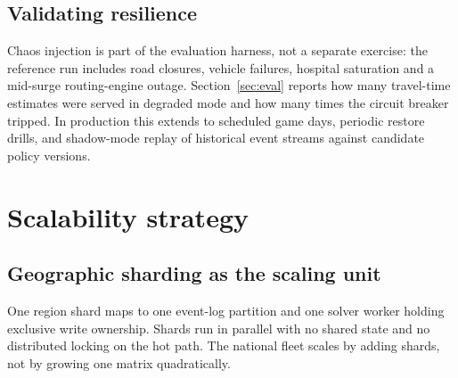 \subsection{Validating resilience}

Chaos injection is part of the evaluation harness, not a separate exercise: the
reference run includes road closures, vehicle failures, hospital saturation and
a mid-surge routing-engine outage. Section~\ref{sec:eval} reports how many
travel-time estimates were served in degraded mode and how many times the
circuit breaker tripped. In production this extends to scheduled game days,
periodic restore drills, and shadow-mode replay of historical event streams
against candidate policy versions.

\section{Scalability strategy}

\subsection{Geographic sharding as the scaling unit}

\begin{center}
\end{center}

One region shard maps to one event-log partition and one solver worker holding
exclusive write ownership. Shards run in parallel with no shared state and no
distributed locking on the hot path. The national fleet scales by adding
shards, not by growing one matrix quadratically.

